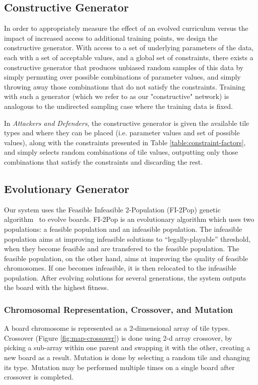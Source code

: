 \documentclass[letterpaper]{article} %
\begin{document}
\subsection{Constructive Generator}\label{sec:case-constructive-generator}
In order to appropriately measure the effect of an evolved curriculum versus the impact of increased access to additional training points, we design the constructive generator. With access to a set of underlying parameters of the data, each with a set of acceptable values, and a global set of constraints, there exists a constructive generator that produces unbiased random samples of this data by simply permuting over possible combinations of parameter values, and simply throwing away those combinations that do not satisfy the constraints. Training with such a generator (which we refer to as our "constructive" network) is analogous to the undirected sampling case where the training data is fixed.

In \textit{Attackers and Defenders}, the constructive generator is given the available tile types and where they can be placed (i.e. parameter values and set of possible values), along with the constraints presented in Table \ref{table:constraint-factors}, and simply selects random combinations of tile values, outputting only those combinations that satisfy the constraints and discarding the rest.

\subsection{Evolutionary Generator}\label{sec:case-generator}
Our system uses the Feasible Infeasible 2-Population (FI-2Pop) genetic algorithm~\cite{kimbrough2008feasible} to evolve boards. FI-2Pop is an evolutionary algorithm which uses two populations: a feasible population and an infeasible population. The infeasible population aims at improving infeasible solutions to ``legally-playable'' threshold, when they become feasible and are transfered to the feasible population. The feasible population, on the other hand, aims at improving the quality of feasible chromosomes. If one becomes infeasible, it is then relocated to the infeasible population. After evolving solutions for several generations, the system outputs the board with the highest fitness.

\subsubsection{Chromosomal Representation, Crossover, and Mutation}
A board chromosome is represented as a 2-dimensional array of tile types. Crossover (Figure \ref{fig:map-crossover}) is done using 2-d array crossover, by picking a sub-array within one parent and swapping it with the other, creating a new board as a result. Mutation is done by selecting a random tile and changing its type. Mutation may be performed multiple times on a single board after crossover is completed.
\end{document}
